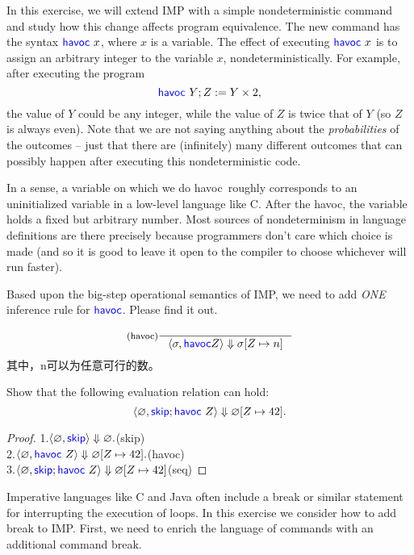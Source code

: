 \documentclass[11pt,a4paper]{article}
\let\emptyset\varnothing
\newcommand{\pair}[1]{\langle #1 \rangle}
\newcommand{\evalC}[3]{\pair{#1, #2} \Downarrow #3}
\newcommand{\kword}[1]{{\color{blue} \textsf{#1}}}
\newcommand{\Skip}{\kword{skip}}
\newcommand{\Havoc}{\kword{havoc}}
\newcommand{\Break}{\kword{break}}
\begin{document}
In this exercise, we will extend IMP with a simple nondeterministic command and study how this change affects program equivalence.
The new command has the syntax $\Havoc~x$, where $x$ is a variable.
The effect of executing $\Havoc~x$ is to assign an arbitrary integer to the variable $x$, nondeterministically.
For example, after executing the program
$$\Havoc~Y;Z:=Y\times 2,$$
the value of $Y$ could be any integer, while the value of $Z$ is twice that of $Y$ (so $Z$ is always even).
Note that we are not saying anything about the \emph{probabilities} of the outcomes -- just that there are (infinitely) many different outcomes that can possibly happen after executing this nondeterministic code.

In a sense, a variable on which we do \Havoc~roughly corresponds to an uninitialized variable in a low-level language like C.
After the \Havoc, the variable holds a fixed but arbitrary number.
Most sources of nondeterminism in language definitions are there precisely because programmers don't care which choice is made (and so it is good to leave it open to the compiler to choose whichever will run faster).

\subproblem Based upon the big-step operational semantics of IMP, we need to add \emph{ONE} inference rule for $\Havoc$.
Please find it out.

\begin{solution}
\begin{align*}
&\inference[(havoc)]{}{\evalC{\sigma}{\Havoc Z}{\sigma[Z \mapsto n]}} \\
\end{align*}
其中，n可以为任意可行的数。
\end{solution}

\subproblem Show that the following evaluation relation can hold:
$$\evalC{\emptyset}{\Skip;\Havoc~Z}{\emptyset[Z \mapsto 42]}.$$
\begin{proof}
1.$\evalC{\emptyset}{\Skip}{\emptyset}.$(skip)\\
2.$\evalC{\emptyset}{\Havoc~Z}{\emptyset[Z \mapsto 42]}.$(havoc)\\
3.$\evalC{\emptyset}{\Skip;\Havoc~Z}{\emptyset[Z \mapsto 42]}$(seq)
\end{proof}

\newpage
{}

Imperative languages like C and Java often include a break or similar statement for interrupting the execution of loops.
In this exercise we consider how to add break to IMP.
First, we need to enrich the language of commands with an additional command \Break.
\end{document}
